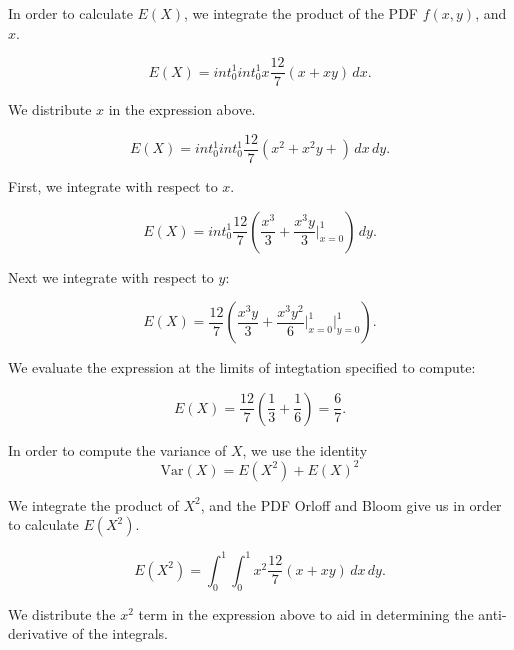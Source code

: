 \documentclass[a5paper,11pt]{article}
\begin{document}
In order to calculate $E\left(X \right)$,
we integrate the product of the 
PDF $f\left(x, y \right)$, and $x$.

\begin{equation}
E\left( X \right) =
int_0^1 int_0^1 x \frac{12}{7} \left(  
x + xy
\right)\,dx.
\end{equation}

We distribute $x$ in the expression above.

\begin{equation}
E\left( X \right) =
int_0^1 int_0^1  \frac{12}{7} 
  \left(x^2 + x^2y + \right)\,dx \,dy. 
\end{equation}

First, we integrate with respect to
$x$.

\begin{equation}
E\left( X \right) =
int_0^1  \frac{12}{7} 
  \left(\frac{x^3}{3} + \frac{x^3y}{3} 
 \bigg\rvert_{x=0}^1 \right)\,dy. 
\end{equation}

Next we integrate with respect to $y$:

\begin{equation}
E\left( X \right) =
 \frac{12}{7} 
  \left(\frac{x^3y}{3} + \frac{x^3y^2}{6} 
  \bigg\rvert_{x=0}^1 
  \bigg\rvert_{y=0}^1 
 \right). 
\end{equation}

We evaluate the expression at the limits
of integtation specified to compute:

\begin{equation}
E \left(X \right) =
\frac{12}{7} \left(
  \frac{1}{3} + \frac{1}{6} \right)
  = \frac{6}{7}.
\end{equation}

In order to compute the variance of $X$,
we use the identity
\begin{equation}
\text{Var} \left(X \right) =
E \left(X^2 \right) + E \left(X \right)^2
\end{equation}

We integrate the product of $X^2$, and
the PDF Orloff and Bloom give us in
order to calculate $E \left(X^2 \right)$.

\begin{equation}
E \left(X^2 \right)  =
\int_0^1 \int_0^1 x^2 \frac{12}{7} \left(
x+xy \right) \,dx \,dy. 
\end{equation}

We distribute the $x^2$ term in the
expression above to aid in determining
the anti-derivative of the integrals.
\end{document}
